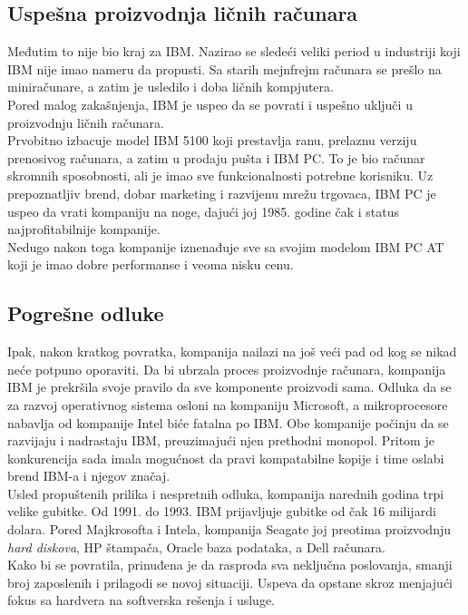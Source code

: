 \documentclass[a4paper]{article}
\begin{document}
\subsection{Uspešna proizvodnja ličnih računara}
Međutim to nije bio kraj za IBM. Nazirao se sledeći veliki period u industriji koji IBM nije imao nameru da propusti. Sa starih mejnfrejm računara se prešlo na miniračunare, a zatim je usledilo i doba ličnih kompjutera. \\Pored malog zakašnjenja, IBM je uspeo da se povrati i uspešno uključi u proizvodnju ličnih računara.\\ Prvobitno izbacuje model IBM 5100 koji prestavlja ranu, prelaznu verziju prenosivog računara, a zatim u prodaju pušta i IBM PC. To je bio računar skromnih sposobnosti, ali je imao sve funkcionalnosti potrebne korisniku. Uz prepoznatljiv brend, dobar marketing i razvijenu mrežu trgovaca, IBM PC je uspeo da vrati kompaniju na noge, dajući joj 1985. godine čak i status najprofitabilnije kompanije.%
 \\Nedugo nakon toga kompanije iznenađuje sve sa svojim modelom IBM PC AT koji je imao dobre performanse i veoma nisku cenu. 
\subsection{Pogrešne odluke}
Ipak, nakon kratkog povratka, kompanija nailazi na još veći pad od kog se nikad neće potpuno oporaviti. 
Da bi ubrzala proces proizvodnje računara, kompanija IBM je prekršila svoje pravilo da sve komponente proizvodi sama. Odluka da se za razvoj operativnog sistema osloni na kompaniju Microsoft, a mikroprocesore nabavlja od kompanije Intel biće fatalna po IBM\cite{istorija}. Obe kompanije počinju da se razvijaju i nadrastaju IBM, preuzimajući njen prethodni monopol. Pritom je konkurencija sada imala mogućnost da pravi kompatabilne kopije i time oslabi brend IBM-a i njegov značaj.  \\
Usled propuštenih prilika i nespretnih odluka, kompanija narednih godina trpi velike gubitke. Od 1991. do 1993. IBM prijavljuje gubitke od čak 16 milijardi dolara. Pored Majkrosofta i Intela, kompanija Seagate joj preotima proizvodnju \emph{hard diskova}, HP štampača, Oracle baza podataka, a Dell računara. \\ 
Kako bi se povratila, prinuđena je da rasproda sva neključna poslovanja, smanji broj zaposlenih i prilagodi se novoj situaciji. Uspeva da opstane skroz menjajući fokus sa hardvera na softverska rešenja i usluge.
\end{document}
